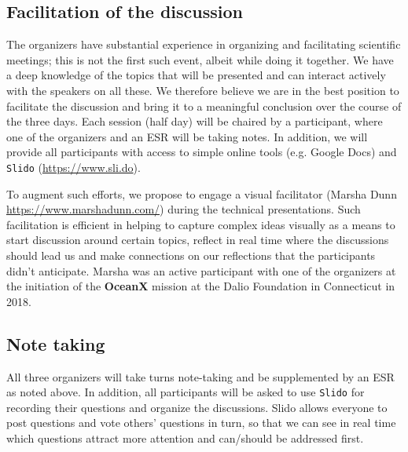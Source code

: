 \subsection{Facilitation of the discussion}

The organizers have substantial experience in organizing and
facilitating scientific meetings; this is not the first such event,
albeit while doing it together. We have a deep knowledge of the topics
that will be presented and can interact actively with the speakers on
all these. We therefore believe we are in the best position to
facilitate the discussion and bring it to a meaningful conclusion over
the course of the three days. Each session (half day) will be chaired by
a participant, where one of the organizers and an ESR will be taking
notes. In addition, we will provide all participants with access to
simple online tools (e.g. Google Docs) and \texttt{Slido}
(\url{https://www.sli.do}). 


To augment such efforts, we propose to engage a visual facilitator
(Marsha Dunn \url{https://www.marshadunn.com/}) during the technical
presentations. Such facilitation is efficient in helping to capture
complex ideas visually as a means to start discussion around certain
topics, reflect in real time where the discussions should lead us and
make connections on our reflections that the participants didn't
anticipate. Marsha was an active participant with one of the organizers
at the initiation of the \textbf{OceanX} mission at the Dalio Foundation
in Connecticut in 2018.
 
\subsection{Note taking}

All three organizers will take turns note-taking and be supplemented by
an ESR as noted above. In addition, all participants will be asked to
use \texttt{Slido} for recording their questions and organize the
discussions. Slido allows everyone to post questions and vote others'
questions in turn, so that we can see in real time which questions
attract more attention and can/should be addressed first.
 
